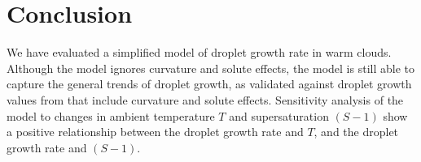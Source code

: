 \documentclass[]{article}
\begin{document}
\section{Conclusion}
We have evaluated a simplified model of droplet growth rate in warm clouds.
Although the model ignores curvature and solute effects, the model is still
able to capture the general trends of droplet growth, as validated against
droplet growth values from \cite{Curry, Mason, Best} that include curvature and
solute effects. Sensitivity analysis of the model to changes in ambient temperature $T$
and supersaturation $(S -1)$ show a positive relationship between the droplet growth rate
and $T$, and the droplet growth rate and $(S - 1)$.





\end{document}
